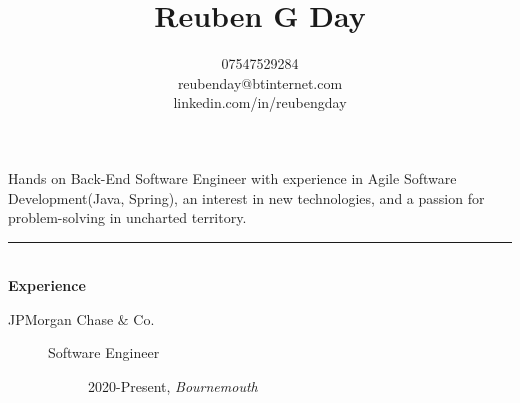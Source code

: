 \documentclass[12pt, a4paper]{article}
\date{}
\title{\vspace{-6ex}Reuben G Day }
\author{07547529284 \\ reubenday@btinternet.com \\ linkedin.com/in/reubengday} %
\begin{document}
    \maketitle
    \vspace{-5ex}

    \begin{center}
        Hands on Back-End Software Engineer with experience in Agile Software Development(Java, Spring), an interest in new technologies, and a passion for problem-solving in uncharted territory.
    \end{center}

    \vspace{-2ex}

    \noindent\rule{8cm}{0.4pt} \\
    \textbf{Experience}
    \begin{description}
        \item[JPMorgan Chase $\&$ Co.]\textbf{}
        \begin{description}
            \item[Software Engineer] 2020-Present, \textit{Bournemouth}

        \end{description}

    \end{description}

    \vspace{-2ex}
\end{document}
